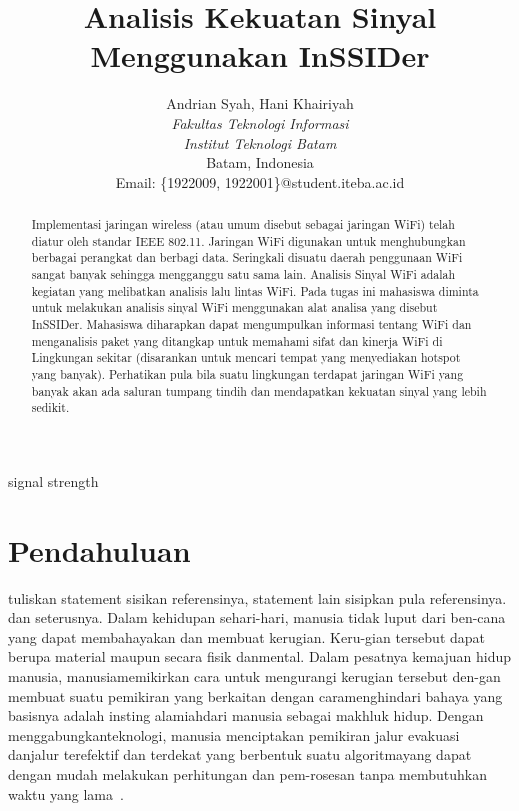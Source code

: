 \documentclass[conference]{IEEEtran}
\title{Analisis Kekuatan Sinyal Menggunakan InSSIDer}
\author{Andrian Syah\IEEEauthorrefmark{1}, Hani Khairiyah\IEEEauthorrefmark{2}\\
\textit{Fakultas Teknologi Informasi}\\
\textit{Institut Teknologi Batam}\\
Batam, Indonesia\\
Email: \{\IEEEauthorrefmark{1}1922009, \IEEEauthorrefmark{2}1922001\}@student.iteba.ac.id}
\begin{document}
\maketitle

\begin{abstract}
Implementasi jaringan wireless (atau umum disebut sebagai jaringan WiFi) telah diatur oleh standar IEEE 802.11. Jaringan WiFi digunakan untuk menghubungkan berbagai perangkat dan berbagi data. Seringkali disuatu daerah penggunaan WiFi sangat banyak sehingga mengganggu satu sama lain. Analisis Sinyal WiFi adalah kegiatan yang melibatkan analisis lalu lintas WiFi. Pada tugas ini mahasiswa diminta untuk melakukan analisis sinyal WiFi menggunakan alat analisa yang disebut InSSIDer. Mahasiswa diharapkan dapat mengumpulkan informasi tentang WiFi dan menganalisis paket yang ditangkap untuk memahami sifat dan kinerja WiFi di Lingkungan sekitar (disarankan untuk mencari tempat yang menyediakan hotspot yang banyak). Perhatikan pula bila suatu lingkungan terdapat jaringan WiFi yang banyak akan ada saluran tumpang tindih dan mendapatkan kekuatan sinyal yang lebih sedikit.
\end{abstract}

\begin{IEEEkeywords}
signal strength
\end{IEEEkeywords}

\section{Pendahuluan}
tuliskan statement sisikan referensinya, statement lain sisipkan pula referensinya. dan seterusnya. Dalam kehidupan sehari-hari, manusia tidak luput dari ben-cana yang dapat membahayakan dan membuat kerugian. Keru-gian  tersebut  dapat  berupa  material  maupun  secara  fisik  danmental.  Dalam  pesatnya  kemajuan  hidup  manusia,  manusiamemikirkan  cara  untuk  mengurangi  kerugian  tersebut  den-gan  membuat  suatu  pemikiran  yang  berkaitan  dengan  caramenghindari  bahaya  yang  basisnya  adalah  insting  alamiahdari manusia sebagai makhluk hidup. Dengan menggabungkanteknologi, manusia menciptakan pemikiran jalur evakuasi danjalur  terefektif  dan  terdekat  yang  berbentuk  suatu  algoritmayang  dapat  dengan  mudah  melakukan  perhitungan  dan  pem-rosesan tanpa membutuhkan waktu yang lama~\cite{hata1980mobile}.
\end{document}
